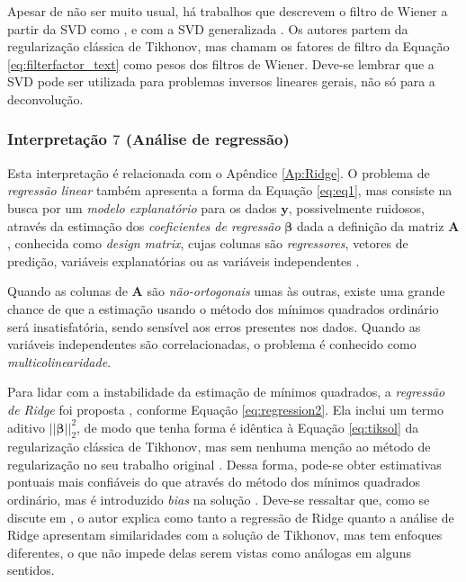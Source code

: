 Apesar de não ser muito usual, há trabalhos que descrevem o filtro de Wiener a partir da SVD como \cite[págs. 38-9]{bai2013acoustic}, \cite[pág. 95]{zhang2010machine} e com a SVD generalizada \cite[pág. 103]{zhang2010machine}. Os autores partem da regularização clássica de Tikhonov, mas chamam os fatores de filtro da Equação \eqref{eq:filterfactor_text} como pesos dos filtros de Wiener. Deve-se lembrar que a SVD pode ser utilizada para problemas inversos lineares gerais, não só para a deconvolução.

\subsubsection{Interpretação $7$ (Análise de regressão)}

Esta interpretação é relacionada com o Apêndice \ref{Ap:Ridge}. O problema de \textit{regressão linear} também apresenta a forma da Equação \eqref{eq:eq1}, mas consiste na busca por um \textit{modelo explanatório} para os dados $\mathbf{y}$, possivelmente ruidosos, através da estimação dos \textit{coeficientes de regressão} $\bm{\beta}$ dada a definição da matriz $\mathbf{A}$, conhecida como \textit{design matrix}, cujas colunas são \textit{regressores}, vetores de predição, variáveis explanatórias ou as variáveis independentes \cite{aster2019parameter}. 

Quando as colunas de $\mathbf{A}$ são \textit{não-ortogonais} umas às outras, existe uma grande chance de que a estimação usando o método dos mínimos quadrados ordinário será insatisfatória, sendo sensível aos erros presentes nos dados. Quando as variáveis independentes são correlacionadas, o problema é conhecido como \textit{multicolinearidade}.
 
Para lidar com a instabilidade da estimação de mínimos quadrados, a \textit{regressão de Ridge} foi proposta \cite{Hoerl1970, Hoerl2020}, conforme Equação \eqref{eq:regression2}. Ela inclui um termo aditivo $\vert\vert \bm{\beta} \vert\vert^2_2$, de modo que tenha forma é idêntica à Equação \eqref{eq:tiksol} da regularização clássica de Tikhonov, mas sem nenhuma menção ao método de regularização no seu trabalho original \cite{Hoerl1970}. Dessa forma, pode-se obter estimativas pontuais mais confiáveis do que através do método dos mínimos quadrados ordinário, mas é introduzido \textit{bias} na solução \cite{Oztrk2000}. Deve-se ressaltar que, como se discute em \cite{Hoerl2020}, o autor explica como tanto a regressão de Ridge quanto a análise de Ridge apresentam similaridades com a solução de Tikhonov, mas tem enfoques diferentes, o que não impede delas serem vistas como análogas em alguns sentidos. 
 
